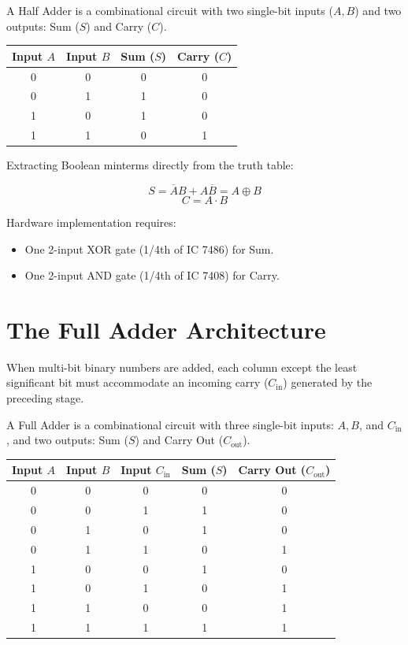 \begin{definition}
A Half Adder is a combinational circuit with two single-bit inputs ($A, B$) and two outputs: Sum ($S$) and Carry ($C$).
\end{definition}

\begin{center}
\begin{tabular}{cc|cc}
\toprule
\textbf{Input $A$} & \textbf{Input $B$} & \textbf{Sum ($S$)} & \textbf{Carry ($C$)} \\
\midrule
0 & 0 & 0 & 0 \\
0 & 1 & 1 & 0 \\
1 & 0 & 1 & 0 \\
1 & 1 & 0 & 1 \\
\bottomrule
\end{tabular}
\end{center}

Extracting Boolean minterms directly from the truth table:
\begin{keyequation}
\[ S = \overline{A}B + A\overline{B} = A \oplus B \]
\[ C = A \cdot B \]
\end{keyequation}
Hardware implementation requires:
\begin{itemize}
    \item One 2-input XOR gate (1/4th of IC 7486) for Sum.
    \item One 2-input AND gate (1/4th of IC 7408) for Carry.
\end{itemize}

\section{The Full Adder Architecture}
When multi-bit binary numbers are added, each column except the least significant bit must accommodate an incoming carry ($C_{\mathrm{in}}$) generated by the preceding stage.

\begin{definition}
A Full Adder is a combinational circuit with three single-bit inputs: $A, B$, and $C_{\mathrm{in}}$, and two outputs: Sum ($S$) and Carry Out ($C_{\mathrm{out}}$).
\end{definition}

\begin{center}
\begin{tabular}{ccc|cc}
\toprule
\textbf{Input $A$} & \textbf{Input $B$} & \textbf{Input $C_{\mathrm{in}}$} & \textbf{Sum ($S$)} & \textbf{Carry Out ($C_{\mathrm{out}}$)} \\
\midrule
0 & 0 & 0 & 0 & 0 \\
0 & 0 & 1 & 1 & 0 \\
0 & 1 & 0 & 1 & 0 \\
0 & 1 & 1 & 0 & 1 \\
1 & 0 & 0 & 1 & 0 \\
1 & 0 & 1 & 0 & 1 \\
1 & 1 & 0 & 0 & 1 \\
1 & 1 & 1 & 1 & 1 \\
\bottomrule
\end{tabular}
\end{center}

